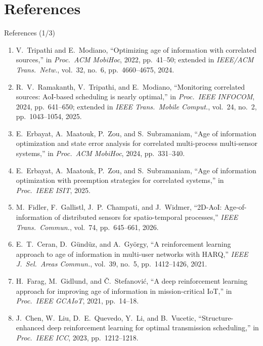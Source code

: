 \documentclass[aspectratio=169,10pt,xcolor=table]{beamer}
\begin{document}
\section{References}

\begin{frame}{References (1/3)}
  \scriptsize
  \begin{enumerate}\setlength\itemsep{0.25em}
    \item[{[1]}] V.~Tripathi and E.~Modiano, ``Optimizing age of information with correlated sources,'' in \emph{Proc.\ ACM MobiHoc}, 2022, pp.~41--50; extended in \emph{IEEE/ACM Trans.\ Netw.}, vol.~32, no.~6, pp.~4660--4675, 2024.
    \item[{[2]}] R.~V.~Ramakanth, V.~Tripathi, and E.~Modiano, ``Monitoring correlated sources: AoI-based scheduling is nearly optimal,'' in \emph{Proc.\ IEEE INFOCOM}, 2024, pp.~641--650; extended in \emph{IEEE Trans.\ Mobile Comput.}, vol.~24, no.~2, pp.~1043--1054, 2025.
    \item[{[3]}] E.~Erbayat, A.~Maatouk, P.~Zou, and S.~Subramaniam, ``Age of information optimization and state error analysis for correlated multi-process multi-sensor systems,'' in \emph{Proc.\ ACM MobiHoc}, 2024, pp.~331--340.
    \item[{[4]}] E.~Erbayat, A.~Maatouk, P.~Zou, and S.~Subramaniam, ``Age of information optimization with preemption strategies for correlated systems,'' in \emph{Proc.\ IEEE ISIT}, 2025.
    \item[{[5]}] M.~Fidler, F.~Gallistl, J.~P.~Champati, and J.~Widmer, ``2D-AoI: Age-of-information of distributed sensors for spatio-temporal processes,'' \emph{IEEE Trans.\ Commun.}, vol.~74, pp.~645--661, 2026.
    \item[{[6]}] E.~T.~Ceran, D.~G\"und\"uz, and A.~Gy\"orgy, ``A reinforcement learning approach to age of information in multi-user networks with HARQ,'' \emph{IEEE J.\ Sel.\ Areas Commun.}, vol.~39, no.~5, pp.~1412--1426, 2021.
    \item[{[7]}] H.~Farag, M.~Gidlund, and \v{C}.~Stefanovi\'c, ``A deep reinforcement learning approach for improving age of information in mission-critical IoT,'' in \emph{Proc.\ IEEE GCAIoT}, 2021, pp.~14--18.
    \item[{[8]}] J.~Chen, W.~Liu, D.~E.~Quevedo, Y.~Li, and B.~Vucetic, ``Structure-enhanced deep reinforcement learning for optimal transmission scheduling,'' in \emph{Proc.\ IEEE ICC}, 2023, pp.~1212--1218.
  \end{enumerate}
\end{frame}
\end{document}
